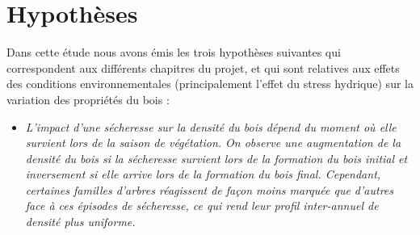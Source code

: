 \documentclass{report}
\begin{document}
\section{Hypothèses}

Dans cette étude nous avons émis les trois hypothèses suivantes qui correspondent aux différents chapitres du projet, et qui sont relatives aux effets des conditions environnementales (principalement l'effet du stress hydrique) sur la variation des propriétés du bois :\\


\begin{itemize}	
	

	\item  \emph{L'impact d'une sécheresse sur la densité du bois dépend du moment où elle survient lors de la saison de végétation. On observe une augmentation de la densité du bois si la sécheresse survient lors de la formation du bois initial et inversement si elle arrive lors de la formation du bois final. Cependant, certaines familles d'arbres réagissent de façon moins marquée que d'autres face à ces épisodes de sécheresse, ce qui rend leur profil inter-annuel de densité plus uniforme.} \\
	

\end{itemize}
\end{document}
